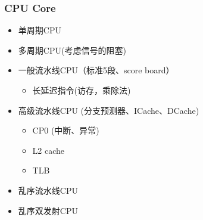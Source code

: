 \documentclass[lang=cn,11pt,a4paper]{elegantpaper}
\begin{document}
\subsubsection{CPU Core}
\begin{itemize}
\item 单周期CPU
\item 多周期CPU(考虑信号的阻塞)
\item 一般流水线CPU（标准5段、score board）
\begin{itemize}
\item 长延迟指令(访存，乘除法)
\end{itemize}
\item 高级流水线CPU (分支预测器、ICache、DCache)
\begin{itemize}
\item CP0 (中断、异常)
\item L2 cache
\item TLB
\end{itemize}
\item 乱序流水线CPU
\item 乱序双发射CPU
\end{itemize}
\end{document}
